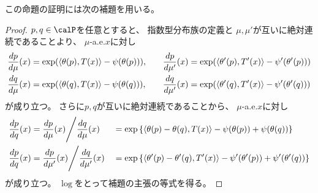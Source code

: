 \documentclass[report]{jlreq}
\begin{document}
この命題の証明には次の補題を用いる。


\begin{proof}
    $p, q \in \calP$を任意とすると、
    指数型分布族の定義と
    $\mu, \mu'$が互いに絶対連続であることより、
    $\mu$-a.e.$x$に対し
    \begin{equation}
        \begin{alignedat}{2}
            \dd[p]{\mu}(x)
                &=
                    \exp(\myangle{\theta(p)}{T(x)} - \psi(\theta(p))),
                    \qquad
            &\dd[p]{\mu'}(x)
                &=
                    \exp(\myangle{\theta'(p)}{T'(x)} - \psi'(\theta'(p)))
                \\
            \dd[q]{\mu}(x)
                &=
                    \exp(\myangle{\theta(q)}{T(x)} - \psi(\theta(q))),
                    \qquad
            &\dd[q]{\mu'}(x)
                &=
                    \exp(\myangle{\theta'(q)}{T'(x)} - \psi'(\theta'(q)))
        \end{alignedat}
    \end{equation}
    が成り立つ。
    さらに$p, q$が互いに絶対連続であることから、
    $\mu$-a.e.$x$に対し
    \begin{alignat}{2}
        \dd[p]{q}(x)
            &=
                \dd[p]{\mu}(x) \Bigg/ \dd[q]{\mu}(x)
            &&=
                \exp\mybrace{
                    \myangle{\theta(p) - \theta(q)}{T(x)}
                    - \psi(\theta(p)) + \psi(\theta(q))
                }
                \\
        \dd[p]{q}(x)
            &=
                \dd[p]{\mu'}(x) \Bigg/ \dd[q]{\mu'}(x)
            &&=
                \exp\mybrace{
                    \myangle{\theta'(p) - \theta'(q)}{T'(x)}
                    - \psi'(\theta'(p)) + \psi'(\theta'(q))
                }
    \end{alignat}
    が成り立つ。
    $\log$をとって補題の主張の等式を得る。
\end{proof}
\end{document}
